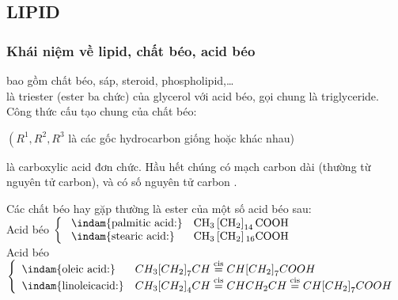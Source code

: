 \subsection{LIPID}
	\subsubsection{Khái niệm về lipid, chất béo, acid béo}
	\begin{tomtat}
		bao gồm chất béo, sáp, steroid, phospholipid,\ldots
		\\
		 là triester (ester ba chức) của glycerol với acid béo, gọi chung là triglyceride.
		\\
		Công thức cấu tạo chung của chất béo:
		\begin{center}
			\begin{minipage}[!htp]{0.45\linewidth}
			\end{minipage}
			\begin{minipage}[b]{0.45\linewidth}
				$\left(R^1, R^2, R^3\right.$ là các gốc hydrocarbon giống hoặc khác nhau)
			\end{minipage}
		\end{center}
		
		là carboxylic acid đơn chức. Hầu hết chúng có mạch carbon dài (thường từ  nguyên tử carbon),  và có số nguyên tử carbon .
	\end{tomtat}
	\begin{hopvidu}
		Các chất béo hay gặp thường là ester của một số acid béo sau:
		\\
		Acid béo  $\left\{\begin{array}{ll}\text { \indam{palmitic acid:}}& \mathrm{CH}_3\left[\mathrm{CH}_2\right]_{14} \mathrm{COOH} \\ 
		\text { \indam{stearic acid:}}& \mathrm{CH}_3\left[\mathrm{CH}_2\right]{ }_{16} \mathrm{COOH}\end{array}\right.$
		\\
		Acid béo  $\left\{\begin{array}{ll}
		\text{\indam{oleic acid:}}& CH_3{\left[CH_2\right]}_{7}CH\overset{\text{cis}}{=}CH{\left[CH_2\right]}_{7}COOH\\
		\text{\indam{linoleicacid:}}& CH_3{\left[CH_2\right]}_{4}CH\overset{\text{cis}}{=}CHCH_2CH\overset{\text{cis}}{=}CH{\left[CH_2\right]}_{7}COOH
		\end{array}\right.$
	\end{hopvidu}
